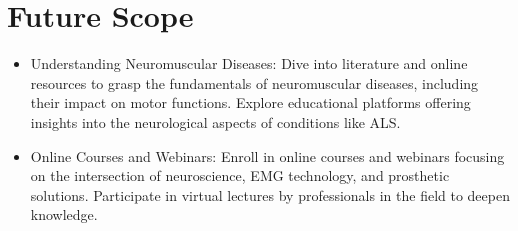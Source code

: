 \documentclass[ 12pt,a4paper,twocolumn,fleqn]{report}
\begin{document}
\section{Future Scope}
\vspace{4mm}
\begin{itemize}
    \item Understanding Neuromuscular Diseases: Dive into literature and online resources to grasp the
fundamentals of neuromuscular diseases, including their impact on motor functions. Explore
educational platforms offering insights into the neurological aspects of conditions like ALS.
\item Online Courses and Webinars: Enroll in online courses and webinars focusing on the
intersection of neuroscience, EMG technology, and prosthetic solutions. Participate in virtual
lectures by professionals in the field to deepen knowledge.
\end{itemize}
\end{document}
